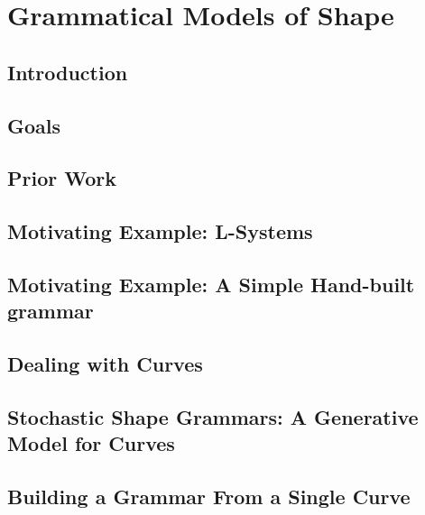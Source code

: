 \documentclass{tufte-book}
\begin{document}
\chapter{Grammatical Models of Shape}

  \section{Introduction}
      

  \section{Goals}
    

  \section{Prior Work}

  \section{Motivating Example: L-Systems}
    

  \section{Motivating Example: A Simple Hand-built grammar}
    

  \section{Dealing with Curves}
    

  \section{Stochastic Shape Grammars: A Generative Model for Curves}
    

    

  \section{Building a Grammar From a Single Curve}
    
\end{document}
